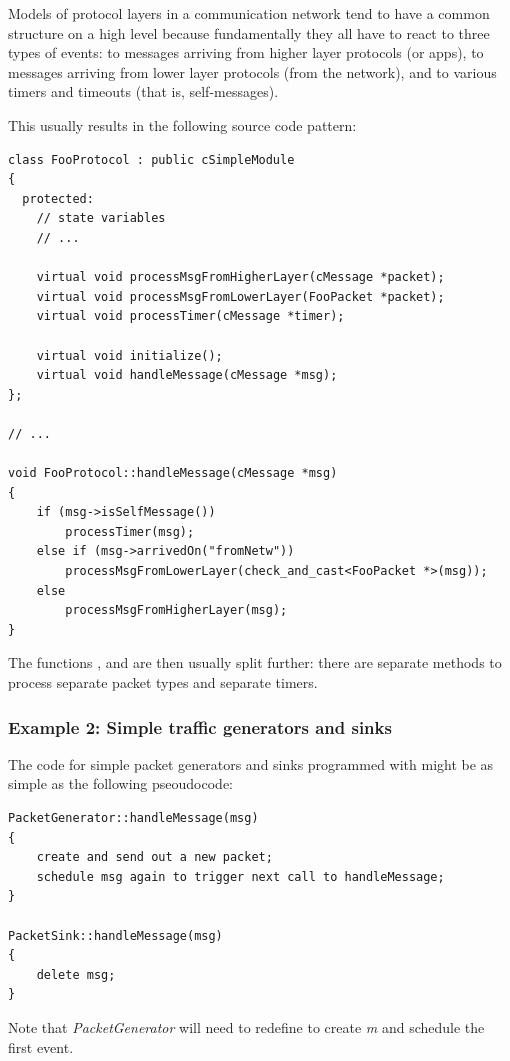 Models of protocol layers in a communication network tend to have
a common structure on a high level because fundamentally they all have to react
to three types of events: to messages arriving from higher layer protocols
(or apps), to messages arriving from lower layer protocols (from the network),
and to various timers and timeouts (that is, self-messages).

This usually results in the following source code pattern:

\begin{verbatim}
class FooProtocol : public cSimpleModule
{
  protected:
    // state variables
    // ...

    virtual void processMsgFromHigherLayer(cMessage *packet);
    virtual void processMsgFromLowerLayer(FooPacket *packet);
    virtual void processTimer(cMessage *timer);

    virtual void initialize();
    virtual void handleMessage(cMessage *msg);
};

// ...

void FooProtocol::handleMessage(cMessage *msg)
{
    if (msg->isSelfMessage())
        processTimer(msg);
    else if (msg->arrivedOn("fromNetw"))
        processMsgFromLowerLayer(check_and_cast<FooPacket *>(msg));
    else
        processMsgFromHigherLayer(msg);
}
\end{verbatim}

The functions , 
and  are then usually split further: there are separate
methods to process separate packet types and separate timers.


\subsubsection{Example 2: Simple traffic generators and sinks}


The code for simple packet generators and sinks programmed with  might
be as simple as the following pseoudocode:

\begin{verbatim}
PacketGenerator::handleMessage(msg)
{
    create and send out a new packet;
    schedule msg again to trigger next call to handleMessage;
}

PacketSink::handleMessage(msg)
{
    delete msg;
}
\end{verbatim}

Note that \textit{PacketGenerator} will need to redefine 
to create \textit{m} and schedule the first event.

